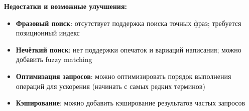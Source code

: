 \textbf{Недостатки и возможные улучшения:}
\begin{itemize}
    \item \textbf{Фразовый поиск}: отсутствует поддержка поиска точных фраз; требуется позиционный индекс
    \item \textbf{Нечёткий поиск}: нет поддержки опечаток и вариаций написания; можно добавить fuzzy matching
    \item \textbf{Оптимизация запросов}: можно оптимизировать порядок выполнения операций для ускорения (начинать с самых редких терминов)
    \item \textbf{Кэширование}: можно добавить кэширование результатов частых запросов
\end{itemize}

\pagebreak
